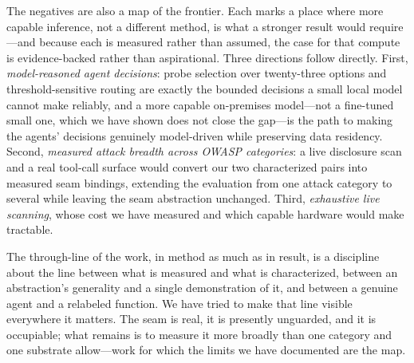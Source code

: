 \documentclass[10pt,twocolumn]{article}
\begin{document}
The negatives are also a map of the frontier. Each marks a place where more
capable inference, not a different method, is what a stronger result would
require---and because each is measured rather than assumed, the case for that
compute is evidence-backed rather than aspirational. Three directions follow
directly. First, \emph{model-reasoned agent decisions}: probe selection over
twenty-three options and threshold-sensitive routing are exactly the bounded
decisions a small local model cannot make reliably, and a more capable on-premises
model---not a fine-tuned small one, which we have shown does not close the
gap---is the path to making the agents' decisions genuinely model-driven while
preserving data residency. Second, \emph{measured attack breadth across OWASP
categories}: a live disclosure scan and a real tool-call surface would convert our
two characterized pairs into measured seam bindings, extending the evaluation from
one attack category to several while leaving the seam abstraction unchanged.
Third, \emph{exhaustive live scanning}, whose cost we have measured and which
capable hardware would make tractable.

The through-line of the work, in method as much as in result, is a discipline
about the line between what is measured and what is characterized, between an
abstraction's generality and a single demonstration of it, and between a genuine
agent and a relabeled function. We have tried to make that line visible
everywhere it matters. The seam is real, it is presently unguarded, and it is
occupiable; what remains is to measure it more broadly than one category and one
substrate allow---work for which the limits we have documented are the map.





\end{document}
